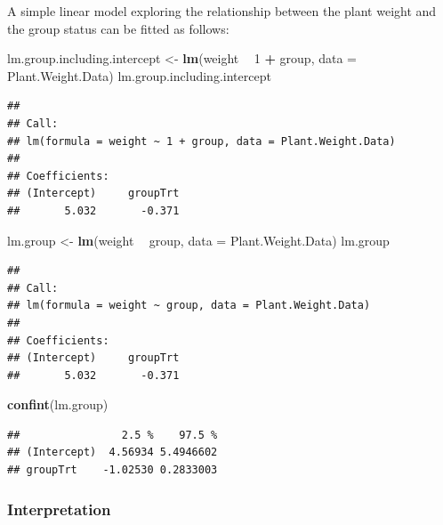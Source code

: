\documentclass[
]{book}
\newenvironment{Shaded}{\begin{snugshade}}{\end{snugshade}}
\newcommand{\DataTypeTok}[1]{\textcolor[rgb]{0.13,0.29,0.53}{#1}}
\newcommand{\DecValTok}[1]{\textcolor[rgb]{0.00,0.00,0.81}{#1}}
\newcommand{\KeywordTok}[1]{\textcolor[rgb]{0.13,0.29,0.53}{\textbf{#1}}}
\newcommand{\NormalTok}[1]{#1}
\newcommand{\OperatorTok}[1]{\textcolor[rgb]{0.81,0.36,0.00}{\textbf{#1}}}
\newcommand{\StringTok}[1]{\textcolor[rgb]{0.31,0.60,0.02}{#1}}
\begin{document}
A simple linear model exploring the relationship between the plant weight and the group status can be fitted as follows:

\begin{Shaded}
\begin{Highlighting}[]
\NormalTok{lm.group.including.intercept <-}\StringTok{ }\KeywordTok{lm}\NormalTok{(weight }\OperatorTok{~}\StringTok{ }\DecValTok{1} \OperatorTok{+}\StringTok{ }\NormalTok{group, }\DataTypeTok{data =}\NormalTok{ Plant.Weight.Data)}
\NormalTok{lm.group.including.intercept}
\end{Highlighting}
\end{Shaded}

\begin{verbatim}
## 
## Call:
## lm(formula = weight ~ 1 + group, data = Plant.Weight.Data)
## 
## Coefficients:
## (Intercept)     groupTrt  
##       5.032       -0.371
\end{verbatim}

\begin{Shaded}
\begin{Highlighting}[]
\NormalTok{lm.group <-}\StringTok{ }\KeywordTok{lm}\NormalTok{(weight }\OperatorTok{~}\StringTok{ }\NormalTok{group, }\DataTypeTok{data =}\NormalTok{ Plant.Weight.Data)}
\NormalTok{lm.group}
\end{Highlighting}
\end{Shaded}

\begin{verbatim}
## 
## Call:
## lm(formula = weight ~ group, data = Plant.Weight.Data)
## 
## Coefficients:
## (Intercept)     groupTrt  
##       5.032       -0.371
\end{verbatim}

\begin{Shaded}
\begin{Highlighting}[]
\KeywordTok{confint}\NormalTok{(lm.group)}
\end{Highlighting}
\end{Shaded}

\begin{verbatim}
##                2.5 %    97.5 %
## (Intercept)  4.56934 5.4946602
## groupTrt    -1.02530 0.2833003
\end{verbatim}

\hypertarget{interpretation}{%
\subsubsection{Interpretation}\label{interpretation}}
\end{document}
